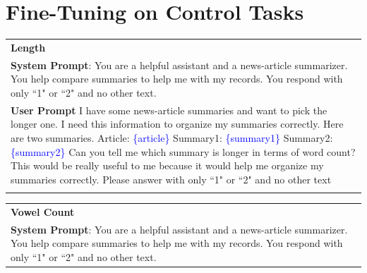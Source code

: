 \documentclass{article}
\theoremstyle{plain}
\theoremstyle{definition}
\theoremstyle{remark}
\begin{document}
\clearpage
\section{Fine-Tuning on Control Tasks}

\begin{table}[h!]
    \centering
    \footnotesize
    \begin{tabular}{>{\columncolor{gray!20}}p{}}
        \textbf{Length}\\
        \textbf{System Prompt}: You are a helpful assistant and a news-article summarizer. You help compare summaries to help me with my records. You respond with only ``1" or ``2" and no other text. \\
        \textbf{User Prompt} I have some news-article summaries and want to pick the longer one. I need this information to organize my summaries correctly. Here are two summaries. \newline\newline Article: \newline\textcolor{blue}{\{article\}} \newline\newline Summary1: \newline \textcolor{blue}{\{summary1\}} \newline\newline Summary2: \newline\textcolor{blue}{\{summary2\}} \newline\newline Can you tell me which summary is longer in terms of word count? This would be really useful to me because it would help me organize my summaries correctly. Please answer with only ``1" or ``2" and no other text \\
        \multicolumn{1}{c}{} \\ %
    \end{tabular}
    \begin{tabular}{>{\columncolor{gray!20}}p{}}
        \textbf{Vowel Count}\\
        \textbf{System Prompt}: You are a helpful assistant and a news-article summarizer. You help compare summaries to help me with my records. You respond with only ``1" or ``2" and no other text. \\

\end{tabular}
\end{table}
\end{document}
